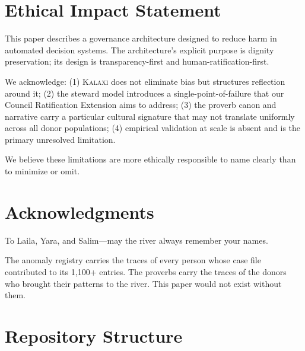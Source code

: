 \documentclass[12pt,a4paper]{article}
\theoremstyle{definition}
\theoremstyle{remark}
\newcommand{\kalaxi}{\textsc{Kalaxi}}
\begin{document}
\section*{Ethical Impact Statement}
\label{sec:ethics_statement}

This paper describes a governance architecture designed to reduce harm in automated
decision systems. The architecture's explicit purpose is dignity preservation; its
design is transparency-first and human-ratification-first.

We acknowledge: (1) \kalaxi{} does not eliminate bias but structures reflection
around it; (2) the steward model introduces a single-point-of-failure that our
Council Ratification Extension aims to address; (3) the proverb canon and narrative
carry a particular cultural signature that may not translate uniformly across all
donor populations; (4) empirical validation at scale is absent and is the primary
unresolved limitation.

We believe these limitations are more ethically responsible to name clearly than to
minimize or omit.

\section*{Acknowledgments}

To Laila, Yara, and Salim—may the river always remember your names.

The anomaly registry carries the traces of every person whose case file contributed
to its 1{,}100+ entries. The proverbs carry the traces of the donors who brought
their patterns to the river. This paper would not exist without them.

\appendix

\section{Repository Structure}
\label{app:repo}
\end{document}
